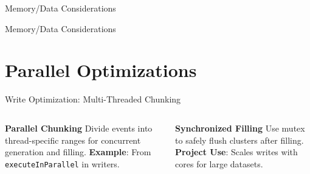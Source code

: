 \documentclass[aspectratio=169]{beamer}
\begin{document}
\begin{frame}{Memory/Data Considerations}
\end{frame}

\begin{frame}{Memory/Data Considerations}
\end{frame}

\section{Parallel Optimizations}
\begin{frame}{Write Optimization: Multi-Threaded Chunking}
  \begin{columns}
    \textbf{Parallel Chunking}
    \small Divide events into thread-specific ranges for concurrent generation and filling.
    \vspace{0.5em}
    \vspace{0.5em}
    \textbf{Example}: From \texttt{executeInParallel} in writers.

    \textbf{Synchronized Filling}
    \small Use mutex to safely flush clusters after filling.
    \vspace{0.5em}
    \vspace{0.5em}
    \textbf{Project Use}: Scales writes with cores for large datasets.
  \end{columns}
\end{frame}
\end{document}
